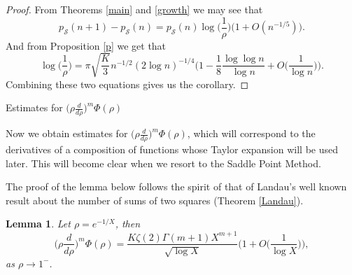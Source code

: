 \documentclass[12pt,reqno]{amsart}
\makeatletter
\def\section{\@startsection{section}{1}
  \z@{.7\linespacing\@plus\linespacing}{.5\linespacing}
  {\normalfont\scshape\bfseries}}
\newtheorem{lemma}[theorem]{Lemma}
\makeatother
\begin{document}
\begin{proof}
    From Theorems \ref{main} and \ref{growth} we may see that
    \begin{equation*}
        p_\mathcal{S}(n+1)-p_\mathcal{S}(n)=p_\mathcal{S}(n)\log\Big(\frac{1}{\rho}\Big)  \Big(1+O(n^{-1/5})\Big).
    \end{equation*}
    And from Proposition \ref{p} we get that
    \begin{equation*}
        \log\Big(\frac{1}{\rho}\Big)=\pi\sqrt{\frac{K}{3}} n^{-1/2}(2\log n)^{-1/4}\Big(1-\frac{1}{8}\frac{\log \log n}{\log n}+O\big(\frac{1}{\log n}\big)\Big).
    \end{equation*}
    Combining these two equations gives us the corollary.
\end{proof}

\section{Estimates for \texorpdfstring{$\Big(\rho \frac{d}{d\rho}\Big)^m \Phi(\rho)$}{a}} \label{operator}


Now we obtain estimates for $\Big(\rho \frac{d}{d\rho}\Big)^m \Phi(\rho)$, which will correspond to the derivatives of a composition of functions whose Taylor expansion will be used later. This will become clear when we resort to the Saddle Point Method. 

The proof of the lemma below follows the spirit of that of Landau's well known result about the number of sums of two squares  (Theorem \ref{Landau}).

\begin{lemma}\label{deriv} Let $\rho=e^{-1/X}$, then
    \begin{equation} 
        \Big(\rho \frac{d}{d\rho}\Big)^m \Phi(\rho)= \frac{K \zeta(2) \Gamma(m+1)X^{m+1}}{\sqrt{\log X}}\Bigg(1+O\Big(\frac{1}{\log X}\Big)\Bigg),
    \end{equation}
    as $\rho \to 1^-$.
\end{lemma}
\end{document}
